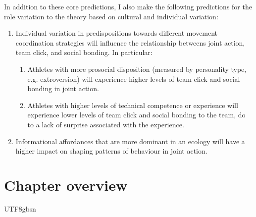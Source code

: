 \begin{CJK}{UTF8}{gbsn}
In addition to these core predictions, I also make the following predictions for the role variation to the theory based on cultural and individual variation:

\begin{enumerate}
  \item Individual variation in predispositions towards different movement coordination strategies will influence the relationship betweens joint action, team click, and social bonding.  In particular:
      \begin{enumerate}
        \item Athletes with more prosocial disposition (measured by personality type, e.g. extroversion) will experience higher levels of team click and social bonding in joint action.
        \item Athletes with higher levels of technical competence or experience will experience lower levels of team click and social bonding to the team, do to a lack of surprise associated with the experience.
      \end{enumerate}

  \item Informational affordances that are more dominant in an ecology will have a higher impact on shaping patterns of behaviour in joint action.

\end{enumerate}








\section{Chapter overview}


                                              \end{CJK}{UTF8}{gbsn}
